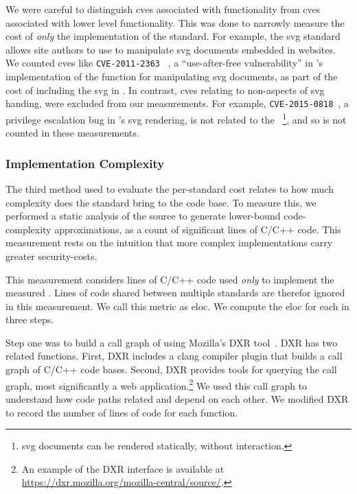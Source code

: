 We were careful to distinguish \gls{cve}s associated with \WAPI functionality
from \gls{cve}s associated with lower level functionality.  This was done to
narrowly measure the cost of \textit{only} the \WAPI implementation of the
standard.  For example, the \gls{svg} standard~\cite{svg2011standard} allows
site authors to use \JS to manipulate \gls{svg} documents embedded in websites.
We counted \gls{cve}s like \texttt{CVE-2011-2363}~\cite{cve_2011_2363} , a
``use-after-free vulnerability'' in \FF's implementation of the \JS function
for manipulating \gls{svg} documents, as part of the cost of including the
\gls{svg} \WAS in \FF.  In contrast, \gls{cve}s relating to non-\WAPI aspects
of \gls{svg} handing, were excluded from our measurements.  For example,
\texttt{CVE-2015-0818}~\cite{cve_2015_0818}, a privilege escalation bug in
\FF's \gls{svg} rendering, is not related to the \WAPI~\footnote{\gls{svg}
documents can be rendered statically, without \JS interaction.}, and so is not
counted in these measurements.


\subsubsection{Implementation Complexity}
\label{cost-benefit:methodology:costs-loc}
The third method used to evaluate the per-standard cost relates to
how much complexity does the standard bring to the code base.  To measure this,
we performed a static analysis of the \FF source to generate lower-bound
code-complexity approximations, as a count of significant lines of C/C++ code.
This measurement rests on the intuition that more complex implementations
carry greater security-costs.

This measurement considers lines of C/C++ code used \emph{only} to implement
the measured \WAS.  Lines of code shared between multiple standards are therefor
ignored in this measurement.  We call this metric as \gls{eloc}.
We compute the \gls{eloc} for each \WAS in three steps.

Step one was to build a call graph of \FF using Mozilla's DXR tool~\cite{dxr}.
DXR has two related functions. First, DXR includes a clang compiler plugin that
builds a call graph of C/C++ code bases.  Second, DXR provides tools for
querying the call graph, most significantly a web application.\footnote{An
example of the DXR interface is available at
\url{https://dxr.mozilla.org/mozilla-central/source/}.} We used this call graph
to understand how code paths related and depend on each other.  We modified DXR
to record the number of lines of code for each function.

